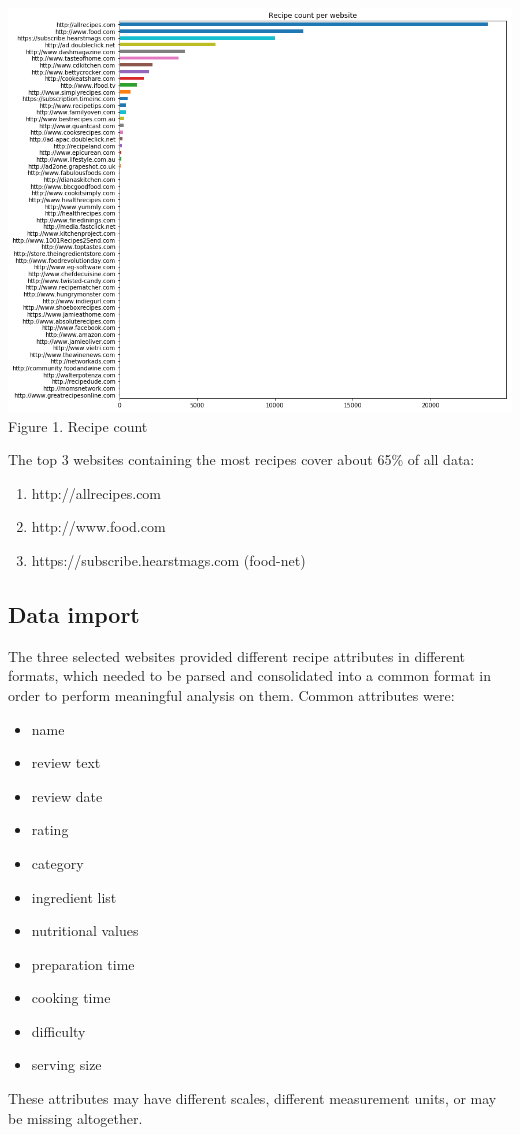 \documentclass[11pt]{article}
\begin{document}
\vspace{5mm}
\begin{center}
\includegraphics[scale=0.22]{website-count}
\label{website-count} Figure 1. Recipe count
\end{center}
\vspace{5mm}

The top 3 websites containing the most recipes cover about 65\% of all data: 
\begin{enumerate}
\item http://allrecipes.com
\item http://www.food.com
\item https://subscribe.hearstmags.com (food-net)
\end{enumerate}

\subsection{Data import}

The three selected websites provided different recipe attributes in different formats, which needed to be parsed and consolidated into a common format in order to perform meaningful analysis on them.
Common attributes were:
\begin{itemize}
    \item name
    \item review text
    \item review date
    \item rating
    \item category
    \item ingredient list
    \item nutritional values
    \item preparation time
    \item cooking time
    \item difficulty
    \item serving size
\end{itemize}
These attributes may have different scales, different measurement units, or may be missing altogether. 
\end{document}
